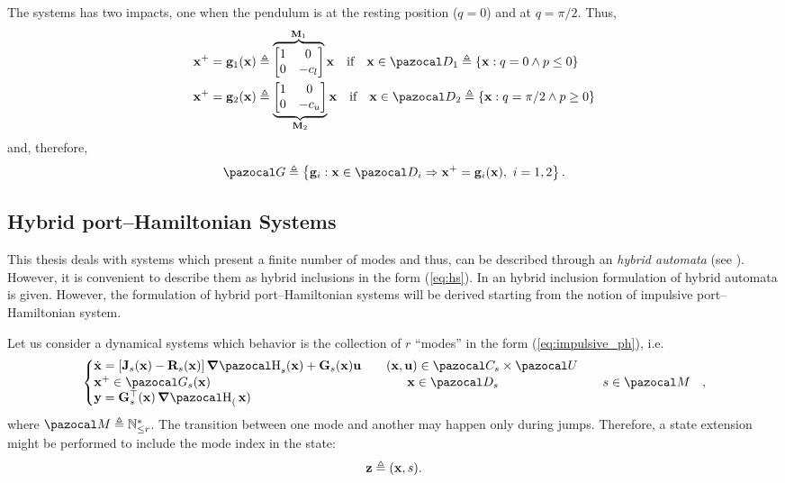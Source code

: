 \begin{exmp}
    The systems has two impacts, one when the pendulum is at the resting position ($q=0$) and at $q = \pi/2$. Thus,
    \begin{align}
        &\xb^+ = \mathbf{g}_1(\xb) \triangleq \overbrace{\begin{bmatrix}1&0\\0&-c_l\end{bmatrix}}^{\mathbf{M}_1}\xb\quad\text{if}\quad\xb\in\D_1\triangleq\left\{\xb:q=0\land p\leq 0\right\} \\
        &\xb^+ = \mathbf{g}_2(\xb) \triangleq \underbrace{\begin{bmatrix}1&0\\0&-c_u\end{bmatrix}}_{\mathbf{M}_2}\xb\quad\text{if}\quad\xb\in\D_2\triangleq\left\{\xb:q=\pi/2\land p\geq 0\right\}
    \end{align}
    and, therefore,
    \begin{equation}
        \G\triangleq\left\{\mathbf{g}_i:\xb\in\D_i\Rightarrow\xb^+ = \mathbf{g}_i(\xb),~i = 1,2\right\}.
    \end{equation}
    \end{exmp}
%
\subsection{Hybrid port--Hamiltonian Systems}
%

This thesis deals with systems which present a finite number of modes and thus, can be described through an \textit{hybrid automata} (see \cite{van2000introduction}). However, it is convenient to describe them as hybrid inclusions in the form (\ref{eq:hs}). In \citep{goebel2009hybrid} an hybrid inclusion formulation of hybrid automata is given. However, the formulation of hybrid port--Hamiltonian systems will be derived starting from the notion of impulsive port--Hamiltonian system.

Let us consider a dynamical systems which behavior is the collection of $r$ ``modes'' in the form (\ref{eq:impulsive_ph}), i.e.
%
\begin{equation}
    \left\{ 
        \begin{matrix*}[l]\vspace{1pt}
            \dot{\xb} = \left[\Jb_s(\xb)-\Rb_s(\xb)\right]\dH_s(\xb) + \Gb_s(\xb)\ub && (\xb,\ub)\in\C_s\times\U\\
            \xb^+ \in \G_s(\xb)&&\quad~~ \xb\in\D_s\\
            \yb = \Gb_s^\top(\xb)\dH_(\xb)
        \end{matrix*}\qquad s\in\M 
    \right.~~,
\end{equation}
%
where $\M\triangleq\mathbb{N}^*_{\leq r}$. The transition between one mode and another may happen only during jumps. Therefore, a state extension might be performed to include the mode index in the state:
%
\begin{equation}
    \mathbf{z} \triangleq (\mathbf{x},s).
\end{equation}
%


